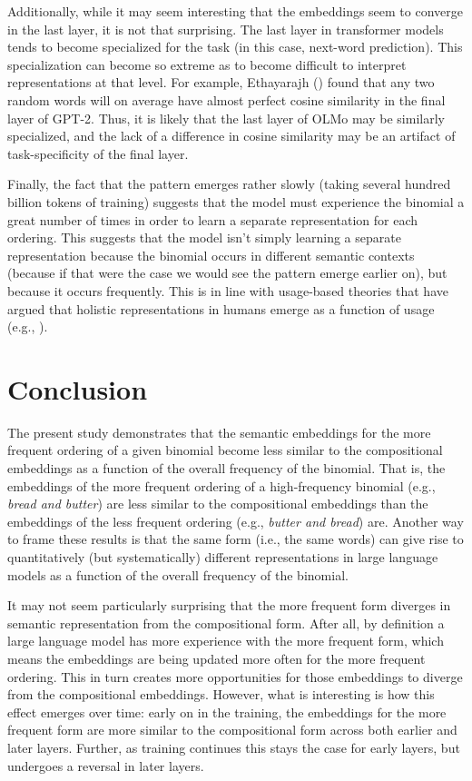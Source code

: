 \documentclass[
  12pt,
  letterpaper,
]{scrreport}
\begin{document}
Additionally, while it may seem interesting that the embeddings seem to
converge in the last layer, it is not that surprising. The last layer in
transformer models tends to become specialized for the task (in this
case, next-word prediction). This specialization can become so extreme
as to become difficult to interpret representations at that level. For
example, Ethayarajh
() found that any two
random words will on average have almost perfect cosine similarity in
the final layer of GPT-2. Thus, it is likely that the last layer of OLMo
may be similarly specialized, and the lack of a difference in cosine
similarity may be an artifact of task-specificity of the final layer.

Finally, the fact that the pattern emerges rather slowly (taking several
hundred billion tokens of training) suggests that the model must
experience the binomial a great number of times in order to learn a
separate representation for each ordering. This suggests that the model
isn't simply learning a separate representation because the binomial
occurs in different semantic contexts (because if that were the case we
would see the pattern emerge earlier on), but because it occurs
frequently. This is in line with usage-based theories that have argued
that holistic representations in humans emerge as a function of usage
(e.g., ).

\section{Conclusion}\label{conclusion-2}

The present study demonstrates that the semantic embeddings for the more
frequent ordering of a given binomial become less similar to the
compositional embeddings as a function of the overall frequency of the
binomial. That is, the embeddings of the more frequent ordering of a
high-frequency binomial (e.g., \emph{bread and butter}) are less similar
to the compositional embeddings than the embeddings of the less frequent
ordering (e.g., \emph{butter and bread}) are. Another way to frame these
results is that the same form (i.e., the same words) can give rise to
quantitatively (but systematically) different representations in large
language models as a function of the overall frequency of the binomial.

It may not seem particularly surprising that the more frequent form
diverges in semantic representation from the compositional form. After
all, by definition a large language model has more experience with the
more frequent form, which means the embeddings are being updated more
often for the more frequent ordering. This in turn creates more
opportunities for those embeddings to diverge from the compositional
embeddings. However, what is interesting is how this effect emerges over
time: early on in the training, the embeddings for the more frequent
form are more similar to the compositional form across both earlier and
later layers. Further, as training continues this stays the case for
early layers, but undergoes a reversal in later layers.
\end{document}
